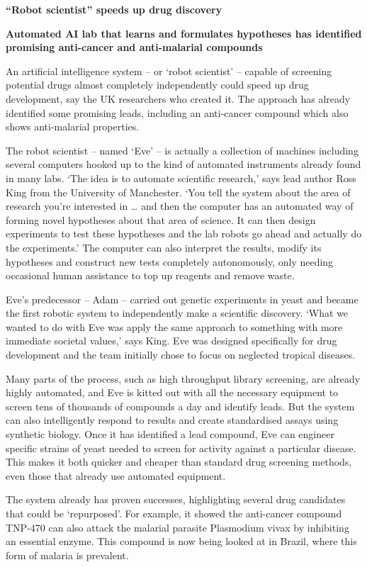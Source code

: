 \documentclass[b5paper]{report}
\begin{document}
\begin{mybox}
  \textbf{``Robot scientist'' speeds up drug discovery}

\textbf{Automated AI lab that learns and formulates hypotheses has identified
promising anti-cancer and anti-malarial compounds}

An artificial intelligence system – or ‘robot scientist’ – capable of screening
potential drugs almost completely independently could speed up drug
development, say the UK researchers who created it. The approach has already
identified some promising leads, including an anti-cancer compound which also
shows anti-malarial properties.

The robot scientist – named ‘Eve’ – is actually a collection of machines
including several computers hooked up to the kind of automated instruments
already found in many labs. ‘The idea is to automate scientific research,’ says
lead author Ross King from the University of Manchester. ‘You tell the system
about the area of research you’re interested in … and then the computer has an
automated way of forming novel hypotheses about that area of science. It can
then design experiments to test these hypotheses and the lab robots go ahead
and actually do the experiments.’ The computer can also interpret the results,
modify its hypotheses and construct new tests completely autonomously, only
needing occasional human assistance to top up reagents and remove waste.

Eve’s predecessor – Adam – carried out genetic experiments in yeast and became
the first robotic system to independently make a scientific discovery. ‘What we
wanted to do with Eve was apply the same approach to something with more
immediate societal values,’ says King. Eve was designed specifically for drug
development and the team initially chose to focus on neglected tropical
diseases.

Many parts of the process, such as high throughput library screening, are
already highly automated, and Eve is kitted out with all the necessary
equipment to screen tens of thousands of compounds a day and identify leads.
But the system can also intelligently respond to results and create
standardised assays using synthetic biology. Once it has identified a lead
compound, Eve can engineer specific strains of yeast needed to screen for
activity against a particular disease. This makes it both quicker and cheaper
than standard drug screening methods, even those that already use automated
equipment.

The system already has proven successes, highlighting several drug candidates
that could be ‘repurposed’. For example, it showed the anti-cancer compound
TNP-470 can also attack the malarial parasite Plasmodium vivax by inhibiting an
essential enzyme. This compound is now being looked at in Brazil, where this
form of malaria is prevalent.


\end{mybox}
\end{document}

